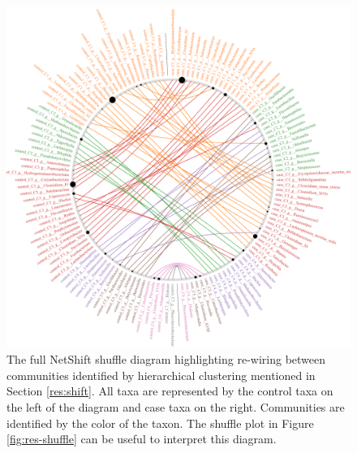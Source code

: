 \begin{figure}[htb!]
    \centering
    \includegraphics[width=1.0\linewidth]{figure/results/shuffle_net.png}
    \caption[The full NetShift shuffle diagram highlighting re-wiring between communities identified by hierarchical clustering.]{The full NetShift shuffle diagram highlighting re-wiring between communities identified by hierarchical clustering mentioned in Section \ref{res:shift}. All taxa are represented by the control taxa on the left of the diagram and case taxa on the right. Communities are identified by the color of the taxon. The shuffle plot in Figure \ref{fig:res-shuffle} can be useful to interpret this diagram.}
    \label{apdx-nesh-shuffle}
\end{figure}
